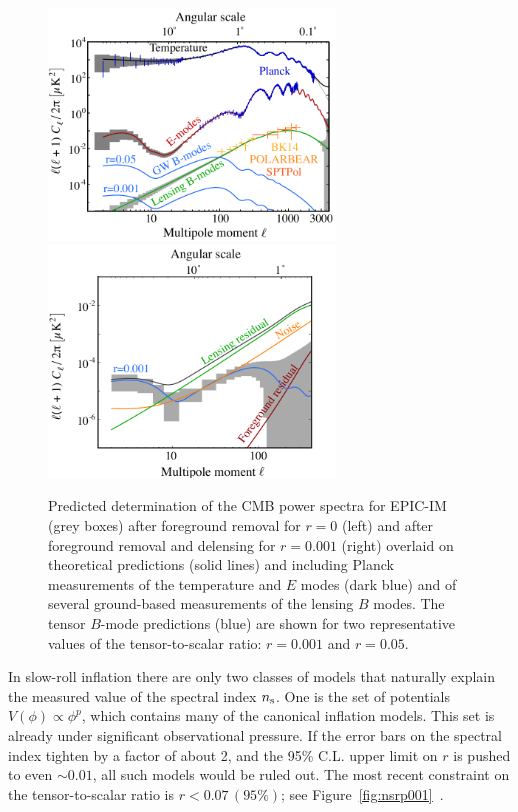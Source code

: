 \begin{figure}[ht!]
\begin{center}
\includegraphics[width=3in]{figs/cmb_powspec_v1.pdf}  
\includegraphics[width=3in]{figs/cmbbb_powspec_v1.pdf}
\end{center}
\vspace{-0.25in}
\caption{ \small \setlength{\baselineskip}{0.95\baselineskip}
Predicted determination of the \ac{CMB} power spectra for EPIC-IM (grey boxes) after foreground removal for $r=0$ (left) and after foreground removal and delensing for $r=0.001$ (right) overlaid on theoretical predictions (solid lines) and including Planck measurements of the temperature and $E$ modes (dark blue) and of several ground-based measurements of the lensing $B$ modes.  The tensor $B$-mode predictions (blue) are shown for two representative values of the tensor-to-scalar ratio: $r=0.001$ and $r=0.05.$ 
\label{fig:clall} }
\vspace{-0.05in}
\end{figure}


In slow-roll inflation there are only two classes of models that naturally explain the measured value of the spectral index $n_{\rm s}$. 
One is the set of potentials $V(\phi)\propto\phi^p$, which contains many of the canonical inflation models. This 
set is already under significant observational pressure. If the error bars on the spectral index tighten by a factor of about 2, 
and the 95\% C.L. upper limit on $r$ is pushed to even $\sim0.01$, all such models would be ruled out. The most recent constraint on the tensor-to-scalar ratio is $r < 0.07 \, (95\%)$; see Figure~\ref{fig:nsrp001}~\cite{Array:2015xqh}. \\

